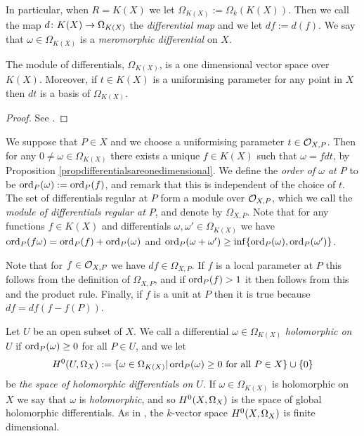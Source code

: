 In particular, when $R = K(X)$ we let $\Omega_{K(X)} := \Omega_k(K(X))$.
Then we call the map $d \colon K(X) \rightarrow \Omega_{K(X)}$ the \emph{differential map} and we let $df := d(f)$.
We say that $\omega \in \Omega_{K(X)}$ is a \emph{meromorphic differential} on $X$.

    \begin{prop}\label{propdifferentialsareonedimensional}
    The module of differentials, $\Omega_{K(X)}$, is a one dimensional vector space over $K(X)$.
    Moreover, if $t \in K(X)$ is a uniformising parameter for any point in $X$ then $dt$ is a basis of $\Omega_{K(X)}$.
    \end{prop}
    \begin{proof}
    See \cite[Prop. 1.5.9]{stichtenoth}.
    \end{proof}

We suppose that $P \in X$ and we choose a uniformising parameter $t \in {\cal O}_{X,P}$.
Then for any $ 0 \neq \omega \in \Omega_{K(X)}$ there exists a unique $f \in K(X)$ such that $\omega = fdt$, by Proposition \ref{propdifferentialsareonedimensional}.
We define the \emph{order of $\omega$ at $P$} to be $\operatorname{ord}_P(\omega) := \operatorname{ord}_P(f)$, and remark that this is independent of the choice of $t$.
The set of differentials regular at $P$ form a module over ${\cal O}_{X,P}$, which we call the \emph{module of differentials regular at $P$}, and denote by $\Omega_{X,P}$.
Note that for any functions $f \in K(X)$ and differentials $\omega, \omega' \in \Omega_{K(X)}$ we have $\operatorname{ord}_P(f\omega) = \operatorname{ord}_P(f) + \operatorname{ord}_P(\omega)$ and $\operatorname{ord}_P(\omega + \omega') \geq \inf\{\operatorname{ord}_P(\omega), \operatorname{ord}_P(\omega')\}$.

Note that for $f \in {\cal O}_{X,P}$ we have $df \in \Omega_{X,P}$.
If $f$ is a local parameter at $P$ this follows from the definition of $\Omega_{X,P}$, and if $\operatorname{ord}_P(f) >1$ it then follows from this and the product rule.
Finally, if $f$ is a unit at $P$ then it is true because $df = df(f - f(P))$.

Let $U$ be an open subset of $X$.
We call a differential $\omega \in \Omega_{K(X)}$ \emph{holomorphic on $U$} if $\operatorname{ord}_P(\omega) \geq 0$ for all $P \in U$, and we let
    \[
    H^0(U, \Omega_X) := \{ \omega \in \Omega_{K(X)} | \operatorname{ord}_P(\omega) \geq 0\ \text{for all}\ P \in X\} \cup \{ 0 \}
    \]
be \emph{the space of holomorphic differentials on $U$}.
If $\omega \in \Omega_{K(X)}$ is holomorphic on $X$ we say that $\omega$ is \emph{holomorphic}, and so ${H^0(X,\Omega_X)}$ is the space of global holomorphic differentials.
As in \cite[Chap.\ 8, \S 2, Prop.\ 3]{fulton}, the $k$-vector space ${H^0(X,\Omega_X)}$ is finite dimensional.

